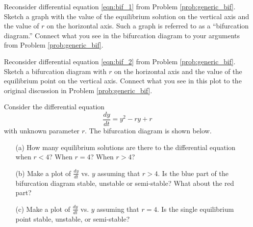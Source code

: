 \begin{problem}
    Reconsider differential equation \eqref{eqn:bif_1} from Problem \ref{prob:generic_bif}.  Sketch
    a graph with the value of the equilibrium solution on the vertical axis and the value
    of $r$ on the horizontal axis.  Such a graph is referred to as a ``bifurcation
    diagram.''  Connect what you see in the bifurcation diagram to your
    arguments from Problem \ref{prob:generic_bif}.
\end{problem}

\begin{problem}
    Reconsider differential equation \eqref{eqn:bif_2} from Problem
    \ref{prob:generic_bif}.  Sketch a bifurcation diagram with $r$ on the horizontal axis
    and the value of the equilibrium point on the vertical axis.  Connect what you see in
    this plot to the original discussion in Problem \ref{prob:generic_bif}.
\end{problem}

\begin{problem}
    Consider the differential equation 
    \[ \frac{dy}{dt} = y^2 - ry + r \]
    with unknown parameter $r$.  The bifurcation diagram is shown below.  
\begin{center}
\end{center}
\begin{enumerate}
    \item[(a)] How many equilibrium solutions are there to the differential equation when
        $r<4$? When $r=4$? When $r>4$?
    \item[(b)] Make a plot of $\frac{dy}{dt}$ vs. $y$ assuming that $r > 4$.  Is the blue
        part of the bifurcation diagram stable, unstable or semi-stable?  What about the
        red part?
    \item[(c)] Make a plot of $\frac{dy}{dt}$ vs. $y$ assuming that $r = 4$.  Is the
        single equilibrium point stable, unstable, or semi-stable?
\end{enumerate}
\end{problem}






